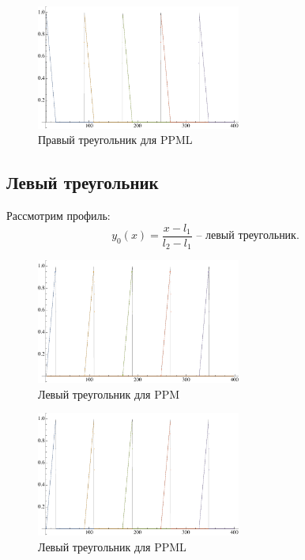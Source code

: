 \documentclass[12pt,a4paper]{article}
\begin{document}
    \begin{figure}[h]
        \centering
        \includegraphics[width=0.6\textwidth]{c=1/h=1./advectionPPML_rightTriangle.pdf}
        \caption{Правый треугольник для PPML}
        \label{fig:ppml_rightTriangle}
    \end{figure}

    \subsection{Левый треугольник}
    Рассмотрим профиль:
    \[
        y_0(x) = \dfrac{x - l_1}{l_2 - l_1} \text{ -- левый треугольник}.
    \]
    
    \begin{figure}[h]
        \centering
        \includegraphics[width=0.6\textwidth]{c=1/h=1./advectionPPM_leftTriangle.pdf}
        \caption{Левый треугольник для PPM}
        \label{fig:ppm_leftTriangle}
    \end{figure}

    \begin{figure}[h]
        \centering
        \includegraphics[width=0.6\textwidth]{c=1/h=1./advectionPPML_leftTriangle.pdf}
        \caption{Левый треугольник для PPML}
        \label{fig:ppml_leftTriangle}
    \end{figure}
\end{document}
